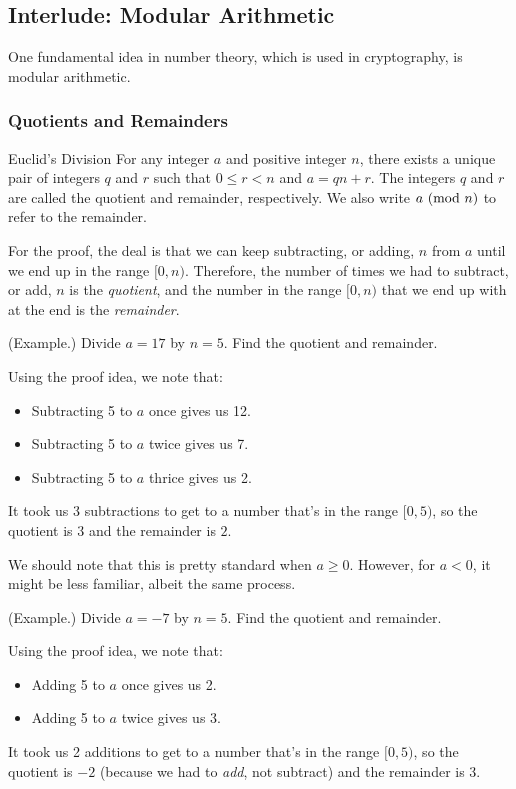 \documentclass[letterpaper]{article}
\begin{document}
\subsection{Interlude: Modular Arithmetic}
One fundamental idea in number theory, which is used in cryptography, is modular arithmetic. 

\subsubsection{Quotients and Remainders}

\begin{lemma}{Euclid's Division}{}
    For any integer $a$ and positive integer $n$, there exists a unique pair of integers $q$ and $r$ such that $0 \leq r < n$ and $a = qn + r$. The integers $q$ and $r$ are called the quotient and remainder, respectively. We also write $a \ (\mathrm{mod}\ n)$ to refer to the remainder.
\end{lemma}
For the proof, the deal is that we can keep subtracting, or adding, $n$ from $a$ until we end up in the range $[0, n)$. Therefore, the number of times we had to subtract, or add, $n$ is the \emph{quotient}, and the number in the range $[0, n)$ that we end up with at the end is the \emph{remainder}. 

\begin{mdframed}
    (Example.) Divide $a = 17$ by $n = 5$. Find the quotient and remainder.
    
    \bigskip 

    Using the proof idea, we note that: 
    \begin{itemize}
        \item Subtracting 5 to $a$ once gives us 12. 
        \item Subtracting 5 to $a$ twice gives us 7.
        \item Subtracting 5 to $a$ thrice gives us 2.
    \end{itemize}
    It took us 3 subtractions to get to a number that's in the range $[0, 5)$, so the quotient is $\boxed{3}$ and the remainder is $\boxed{2}$. 
\end{mdframed}
We should note that this is pretty standard when $a \geq 0$. However, for $a < 0$, it might be less familiar, albeit the same process.

\begin{mdframed}
    (Example.) Divide $a = -7$ by $n = 5$. Find the quotient and remainder.

    \bigskip 

    Using the proof idea, we note that: 
    \begin{itemize}
        \item Adding 5 to $a$ once gives us 2.
        \item Adding 5 to $a$ twice gives us 3. 
    \end{itemize}
    It took us 2 additions to get to a number that's in the range $[0, 5)$, so the quotient is $\boxed{-2}$ (because we had to \emph{add}, not subtract) and the remainder is $\boxed{3}$. 
\end{mdframed}
\end{document}
